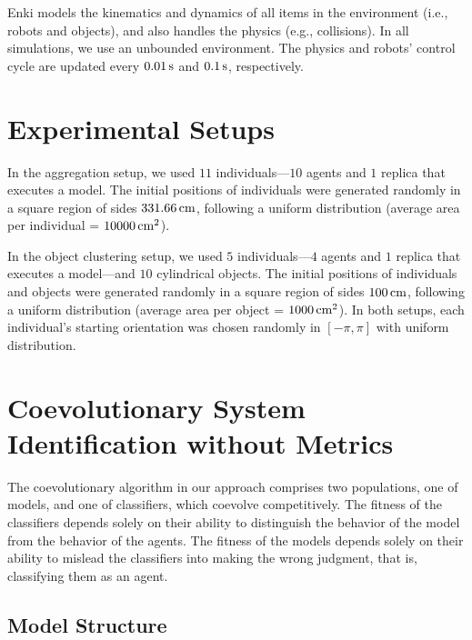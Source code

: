 Enki models the kinematics and dynamics of all items in the environment (i.e., robots and objects), and also handles the physics (e.g., collisions). In all simulations, we use an unbounded environment. The physics and robots' control cycle are updated every $\unit[0.01]{s}$ and $\unit[0.1]{s}$, respectively.

\section{Experimental Setups}\label{sec:simulation_setup}
In the aggregation setup, we used $11$ individuals---$10$ agents and $1$ replica that executes a model. The initial positions of individuals were generated randomly in a square region of sides $\unit[331.66]{cm}$, following a uniform distribution (average area per individual = $\unit[10000]{cm^2}$). 

In the object clustering setup, we used $5$ individuals---$4$ agents and $1$ replica that executes a model---and $10$ cylindrical objects. The initial positions of individuals and objects were generated randomly in a square region of sides $\unit[100]{cm}$, following a uniform distribution (average area per object = $\unit[1000]{cm^2}$). In both setups, each individual's starting orientation was chosen randomly in $[-\pi,\pi]$ with uniform distribution.


\section{Coevolutionary System Identification without Metrics}\label{sec:algorithm_implementation_swarm}

The coevolutionary algorithm in our approach comprises two populations, one of models, and one of classifiers, which coevolve competitively. The fitness of the classifiers depends solely on their ability to distinguish the behavior of the model from the behavior of the agents. The fitness of the models depends solely on their ability to mislead the classifiers into making the wrong judgment, that is, classifying them as an agent.

\subsection{Model Structure} 

